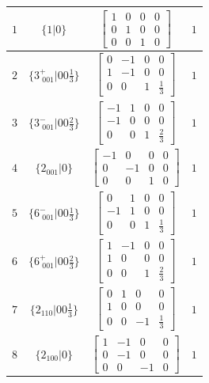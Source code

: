 \documentclass[fleqn,8pt]{jsarticle}
\begin{document}
\begin{longtable}{cccc}
$ 1 $ & $ \{1|0\} $ & $ \begin{bmatrix} 1 & 0 & 0 & 0 \\ 0 & 1 & 0 & 0 \\ 0 & 0 & 1 & 0 \end{bmatrix} $ & $ 1 $ \\ \hline
$ 2 $ & $ \{3^{+}_{\,\,001}|0 0 \frac{1}{3}\} $ & $ \begin{bmatrix} 0 & -1 & 0 & 0 \\ 1 & -1 & 0 & 0 \\ 0 & 0 & 1 & \frac{1}{3} \end{bmatrix} $ & $ 1 $ \\ \hline
$ 3 $ & $ \{3^{-}_{\,\,001}|0 0 \frac{2}{3}\} $ & $ \begin{bmatrix} -1 & 1 & 0 & 0 \\ -1 & 0 & 0 & 0 \\ 0 & 0 & 1 & \frac{2}{3} \end{bmatrix} $ & $ 1 $ \\ \hline
$ 4 $ & $ \{2{}_{001}|0\} $ & $ \begin{bmatrix} -1 & 0 & 0 & 0 \\ 0 & -1 & 0 & 0 \\ 0 & 0 & 1 & 0 \end{bmatrix} $ & $ 1 $ \\ \hline
$ 5 $ & $ \{6^{-}_{\,\,001}|0 0 \frac{1}{3}\} $ & $ \begin{bmatrix} 0 & 1 & 0 & 0 \\ -1 & 1 & 0 & 0 \\ 0 & 0 & 1 & \frac{1}{3} \end{bmatrix} $ & $ 1 $ \\ \hline
$ 6 $ & $ \{6^{+}_{\,\,001}|0 0 \frac{2}{3}\} $ & $ \begin{bmatrix} 1 & -1 & 0 & 0 \\ 1 & 0 & 0 & 0 \\ 0 & 0 & 1 & \frac{2}{3} \end{bmatrix} $ & $ 1 $ \\ \hline
$ 7 $ & $ \{2{}_{110}|0 0 \frac{1}{3}\} $ & $ \begin{bmatrix} 0 & 1 & 0 & 0 \\ 1 & 0 & 0 & 0 \\ 0 & 0 & -1 & \frac{1}{3} \end{bmatrix} $ & $ 1 $ \\ \hline
$ 8 $ & $ \{2{}_{100}|0\} $ & $ \begin{bmatrix} 1 & -1 & 0 & 0 \\ 0 & -1 & 0 & 0 \\ 0 & 0 & -1 & 0 \end{bmatrix} $ & $ 1 $ \\ \hline

\end{longtable}
\end{document}
